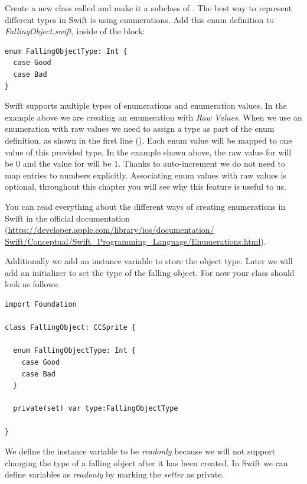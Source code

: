 Create a new class called  and make it a subclass
of \ccsprite{}. The best way to represent different types in Swift is
using enumerations. Add this enum definition to \textit{FallingObject.swift},
inside of the  block:

\begin{lstlisting}
enum FallingObjectType: Int {
  case Good
  case Bad
}
\end{lstlisting}

Swift supports multiple types of enumerations and enumeration values.
In the example above we are creating an enumeration with \textit{Raw Values}.
When we use an enumeration with raw values we need to assign a type as part of
the enum definition, as shown in the first line (). Each enum value will be mapped to one value of this
provided type. In the example shown above, the raw value for
 will be 0 and the value for
 will be 1. Thanks to auto-increment we do not
need to map entries to numbers explicitly. Associating enum values with raw values is optional,
throughout this chapter you will see why this feature is useful to us.

\begin{details}[frametitle={Enumerations in Swift}] 
You can read everything about the different ways of creating enumerations in
Swift in the official documentation
(\url{https://developer.apple.com/library/ios/documentation/
Swift/Conceptual/Swift_Programming_Language/Enumerations.html}).
\end{details}

Additionally we add an instance variable to store the object type. Later we will
add an initializer to set the type of the falling object. For now your class
should look as follows:

\begin{lstlisting}
import Foundation

class FallingObject: CCSprite {

  enum FallingObjectType: Int {
	case Good
	case Bad
  }
    
  private(set) var type:FallingObjectType
  
}
\end{lstlisting}

We define the instance variable to be \textit{readonly} because we will not
support changing the type of a falling object after it has been created. In Swift we can 
define variables as \textit{readonly} by marking the \textit{setter} as private.

